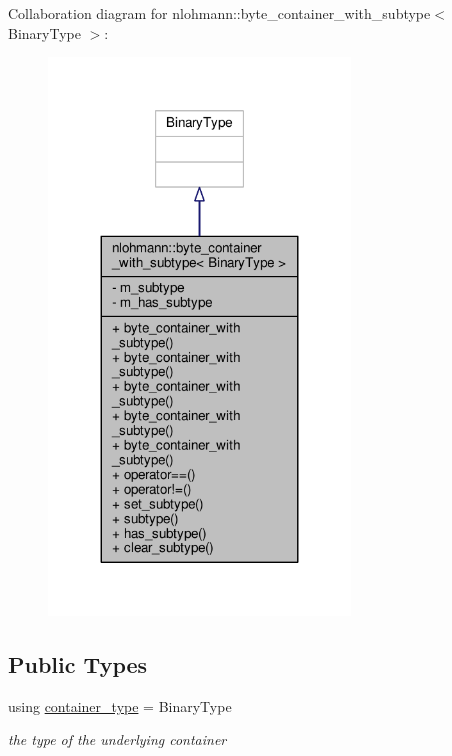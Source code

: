 Collaboration diagram for nlohmann\+:\+:byte\+\_\+container\+\_\+with\+\_\+subtype$<$ Binary\+Type $>$\+:
\nopagebreak
\begin{figure}[H]
\begin{center}
\leavevmode
\includegraphics[width=227pt]{classnlohmann_1_1byte__container__with__subtype__coll__graph}
\end{center}
\end{figure}
\subsection*{Public Types}
\begin{DoxyCompactItemize}
\item 
using \hyperlink{classnlohmann_1_1byte__container__with__subtype_a4d27e8633c5a5e3b49dd4ccb06515713}{container\+\_\+type} = Binary\+Type
\begin{DoxyCompactList}\small\item\em the type of the underlying container \end{DoxyCompactList}\end{DoxyCompactItemize}
